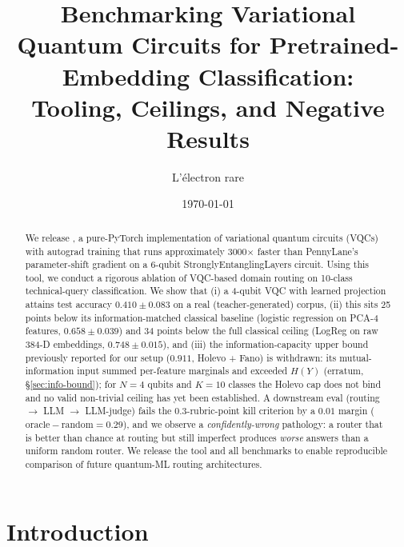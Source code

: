

\title{%
Benchmarking Variational Quantum Circuits for Pretrained-Embedding Classification:\\
Tooling, Ceilings, and Negative Results
}

\author[1]{L'\'electron rare}

\date{\today}


\maketitle

\begin{abstract}
We release \torchvqc{}, a pure-PyTorch implementation of variational quantum circuits (VQCs) with autograd training that runs approximately 3000$\times$ faster than PennyLane's parameter-shift gradient on a 6-qubit StronglyEntanglingLayers circuit. Using this tool, we conduct a rigorous ablation of VQC-based domain routing on 10-class technical-query classification. We show that (i) a 4-qubit VQC with learned projection attains test accuracy $0.410 \pm 0.083$ on a real (teacher-generated) corpus, (ii) this sits 25 points below its information-matched classical baseline (logistic regression on PCA-4 features, $0.658 \pm 0.039$) and 34 points below the full classical ceiling (LogReg on raw 384-D embeddings, $0.748 \pm 0.015$), and (iii) the information-capacity upper bound previously reported for our setup ($0.911$, Holevo + Fano) is withdrawn: its mutual-information input summed per-feature marginals and exceeded $H(Y)$ (erratum, \S\ref{sec:info-bound}); for $N = 4$ qubits and $K = 10$ classes the Holevo cap does not bind and no valid non-trivial ceiling has yet been established. A downstream eval (routing $\to$ LLM $\to$ LLM-judge) fails the $0.3$-rubric-point kill criterion by a $0.01$ margin ($\mathrm{oracle}-\mathrm{random}=0.29$), and we observe a \emph{confidently-wrong} pathology: a router that is better than chance at routing but still imperfect produces \emph{worse} answers than a uniform random router. We release the tool and all benchmarks to enable reproducible comparison of future quantum-ML routing architectures.
\end{abstract}

\section{Introduction}

